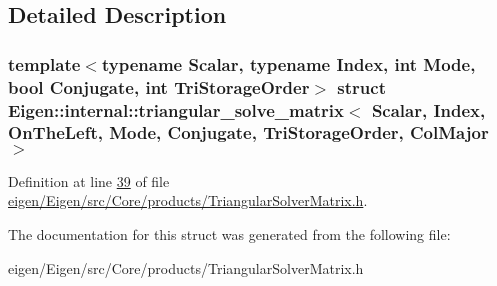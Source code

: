 \subsection{Detailed Description}
\subsubsection*{template$<$typename Scalar, typename Index, int Mode, bool Conjugate, int Tri\+Storage\+Order$>$\newline
struct Eigen\+::internal\+::triangular\+\_\+solve\+\_\+matrix$<$ Scalar, Index, On\+The\+Left, Mode, Conjugate, Tri\+Storage\+Order, Col\+Major $>$}



Definition at line \hyperlink{eigen_2_eigen_2src_2_core_2products_2_triangular_solver_matrix_8h_source_l00039}{39} of file \hyperlink{eigen_2_eigen_2src_2_core_2products_2_triangular_solver_matrix_8h_source}{eigen/\+Eigen/src/\+Core/products/\+Triangular\+Solver\+Matrix.\+h}.



The documentation for this struct was generated from the following file\+:\begin{DoxyCompactItemize}
\item 
eigen/\+Eigen/src/\+Core/products/\+Triangular\+Solver\+Matrix.\+h\end{DoxyCompactItemize}
